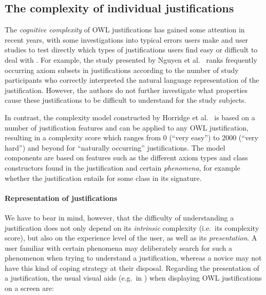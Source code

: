 \subsection{The complexity of individual justifications}

The \emph{cognitive complexity} of OWL justifications has gained some attention in recent years, with some investigations into typical errors users make \cite{roussey09ab,corcho09gj} and user studies to test directly which types of justifications users find easy or difficult to deal with \cite{horridge09ct,horridge11si,nguyen12ab}. For example, the study presented by Nguyen et al.\ \cite{nguyen12ab} ranks frequently occurring axiom subsets in justifications according to the number of study participants who correctly interpreted the natural language representation of the justification. However, the authors do not further investigate what properties cause these justifications to be difficult to understand for the study subjects. 

In contrast, the complexity model constructed by Horridge et al.\ \cite{horridge09ct} is based on a number of justification features and can be applied to any OWL justification, resulting in a complexity score which ranges from 0 (\enquote{very easy}) to 2000 (\enquote{very hard}) and beyond for \enquote{naturally occurring} justifications. The model components are based on features such as the different axiom types and class constructors found in the justification and certain \emph{phenomena}, for example whether the justification entails  for some class  in its signature.


\paragraph{Representation of justifications}

We have to bear in mind, however, that the difficulty of understanding a justification does not only depend on its \emph{intrinsic} complexity (i.e.\ its complexity score), but also on the experience level of the user, as well as its \emph{presentation}. A user familiar with certain phenomena may deliberately search for such a phenomenon when trying to understand a justification, whereas a novice may not have this kind of coping strategy at their disposal. Regarding the presentation of a justification, the usual visual aids (e.g.\ in \protege) when displaying OWL justifications on a screen are:

